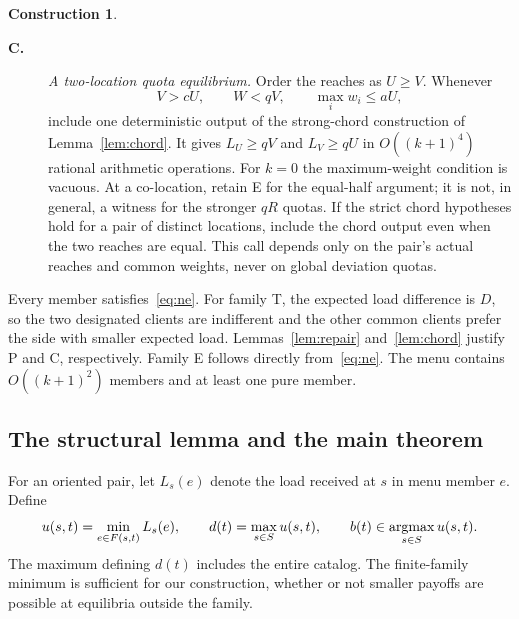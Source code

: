 \documentclass[11pt]{amsart}
\numberwithin{equation}{section}
\theoremstyle{definition}
\newtheorem{construction}[theorem]{Construction}
\begin{document}
\begin{construction}
\begin{description}
\item[\textbf{C.}] \emph{A two-location quota equilibrium.}
Order the reaches as $U\ge V$. Whenever
\[
 V>cU,\qquad W<qV,\qquad \max_iw_i\le aU,
\]
include one deterministic output of the strong-chord construction of
Lemma~\ref{lem:chord}.
It gives $L_U\ge qV$ and $L_V\ge qU$ in
$O((k+1)^4)$ rational arithmetic operations. For $k=0$ the maximum-weight
condition is vacuous. At a co-location, retain E for the equal-half
argument; it is not, in general, a witness for the stronger $qR$ quotas.
If the strict chord hypotheses hold for a pair of distinct locations,
include the chord output even when the two reaches are equal. This call
depends only on the pair's actual reaches and common weights, never on
global deviation quotas.

\end{description}

\end{construction}
Every member satisfies~\eqref{eq:ne}. For family T, the expected load difference is $D$, so the two designated clients are indifferent and the other common clients prefer the side with smaller expected load. Lemmas~\ref{lem:repair} and~\ref{lem:chord} justify P and C, respectively. Family E follows directly from~\eqref{eq:ne}. The menu contains $O((k+1)^2)$ members and at least one pure member.

\subsection{The structural lemma and the main theorem}\label{sec:criterion}
For an oriented pair, let $L_s(e)$ denote the load received at $s$ in menu member $e$. Define
\begin{equation}\label{eq:du}
 u(s,t)=\min_{e\in F(s,t)}L_s(e),\qquad
 d(t)=\max_{s\in S}u(s,t),\qquad
 b(t)\in\mathop{\rm argmax}_{s\in S}u(s,t).
\end{equation}
The maximum defining $d(t)$ includes the entire catalog. The finite-family minimum is sufficient for our construction, whether or not smaller payoffs are possible at equilibria outside the family.
\end{document}
